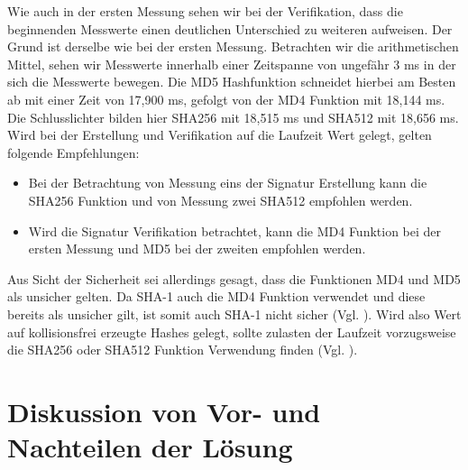 Wie auch in der ersten Messung sehen wir bei der Verifikation, dass die beginnenden Messwerte einen deutlichen Unterschied zu weiteren aufweisen. Der Grund ist derselbe wie bei der ersten Messung. Betrachten wir die arithmetischen Mittel, sehen wir Messwerte innerhalb einer Zeitspanne von ungefähr 3 ms in der sich die Messwerte bewegen. Die MD5 Hashfunktion schneidet hierbei am Besten ab mit einer Zeit von 17,900 ms, gefolgt von der MD4 Funktion mit 18,144 ms. Die Schlusslichter bilden hier SHA256 mit 18,515 ms und SHA512 mit 18,656 ms.\\

Wird bei der Erstellung und Verifikation auf die Laufzeit Wert gelegt, gelten folgende Empfehlungen:
\begin{itemize}
	\item Bei der Betrachtung von Messung eins der Signatur Erstellung kann die SHA256 Funktion und von Messung zwei SHA512 empfohlen werden.
	\item Wird die Signatur Verifikation betrachtet, kann die MD4 Funktion bei der ersten Messung und MD5 bei der zweiten empfohlen werden.
\end{itemize}
Aus Sicht der Sicherheit sei allerdings gesagt, dass die Funktionen MD4 und MD5 als unsicher gelten. Da SHA-1 auch die MD4 Funktion verwendet und diese bereits als unsicher gilt, ist somit auch SHA-1 nicht sicher (Vgl. \cite[S. 103]{kryptographie}). Wird also Wert auf kollisionsfrei erzeugte Hashes gelegt, sollte zulasten der Laufzeit vorzugsweise die SHA256 oder SHA512 Funktion Verwendung finden (Vgl. \cite[S. 40, Tabelle 4.1]{bsi-empfehlungen}).
\section{Diskussion von Vor- und Nachteilen der Lösung}
